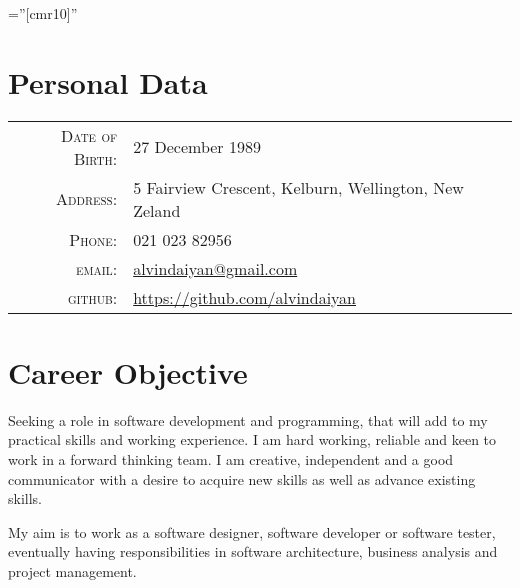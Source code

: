 \documentclass[a4paper,10pt]{article} %
\begin{document}
\pagestyle{empty} %

\font\fb=''[cmr10]'' %


\par{\bigskip\par} %

\section{Personal Data}

\begin{tabular}{rl}
\textsc{Date of Birth:} & 27 December 1989 \\
\textsc{Address:} & 5 Fairview Crescent, Kelburn, Wellington, New Zeland \\
\textsc{Phone:} & 021 023 82956\\
\textsc{email:} & \href{mailto:alvindaiyan@gmail.com}{alvindaiyan@gmail.com} \\
\textsc{github:} & \href{https://github.com/alvindaiyan}{https://github.com/alvindaiyan}
\end{tabular}




\section{Career Objective}

Seeking a role in software development and programming, that will add to my practical skills and working experience. I am hard working, reliable and keen to work in a forward thinking team. I am creative, independent and a good communicator with a desire to acquire new skills as well as advance existing skills.

My aim is to work as a software designer, software developer or software tester, eventually having responsibilities in software architecture, business analysis and project management.
\end{document}

